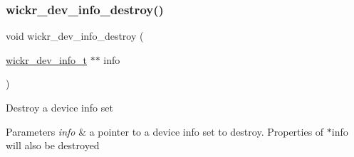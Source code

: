 \subsubsection{\texorpdfstring{wickr\+\_\+dev\+\_\+info\+\_\+destroy()}{wickr\_dev\_info\_destroy()}}
{\footnotesize\ttfamily void wickr\+\_\+dev\+\_\+info\+\_\+destroy (\begin{DoxyParamCaption}\item[{\hyperlink{structwickr__dev__info}{wickr\+\_\+dev\+\_\+info\+\_\+t} $\ast$$\ast$}]{info }\end{DoxyParamCaption})}

Destroy a device info set


\begin{DoxyParams}{Parameters}
{\em info} & a pointer to a device info set to destroy. Properties of \textquotesingle{}$\ast$info\textquotesingle{} will also be destroyed \\
\hline
\end{DoxyParams}
